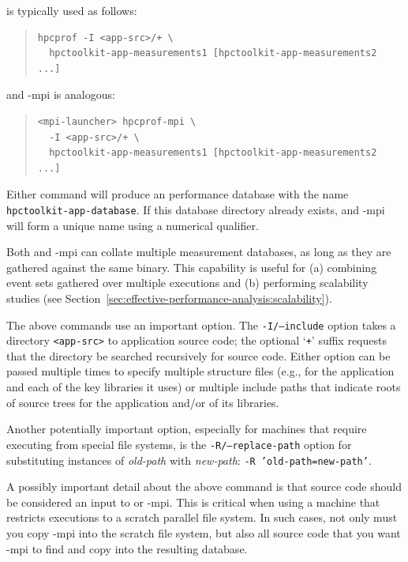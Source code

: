 \documentclass[11pt,twoside,letterpaper]{report}
\begin{document}
\hpcprof{} is typically used as follows:
\begin{quote}
\begin{verbatim}
hpcprof -I <app-src>/+ \
  hpctoolkit-app-measurements1 [hpctoolkit-app-measurements2 ...]
\end{verbatim}
\end{quote}
and \hpcprof-mpi{} is analogous:
\begin{quote}
\begin{verbatim}
<mpi-launcher> hpcprof-mpi \
  -I <app-src>/+ \
  hpctoolkit-app-measurements1 [hpctoolkit-app-measurements2 ...]
\end{verbatim}
\end{quote}
Either command will produce an \HPCToolkit{} performance database with the name \texttt{hpctoolkit-app-database}.
If this database directory already exists, \hpcprof{} and \hpcprof-mpi{} will form a unique name using a numerical qualifier.

Both \hpcprof{} and \hpcprof-mpi{} can collate multiple measurement databases, as long as they are gathered against the same binary.
This capability is useful for (a) combining event sets gathered over multiple executions
and (b) performing scalability studies (see Section~\ref{sec:effective-performance-analysis:scalability}).

The above commands use an important option.
The \texttt{-I/--include} option takes a directory \texttt{<app-src>} to application source code;
the optional `\texttt{+}' suffix requests that the directory be searched recursively for source code.
Either option can be passed multiple times to specify multiple structure files (e.g., for the application
and each of the key libraries it uses) or multiple include paths that indicate
roots of source trees for the application and/or of its libraries.

Another potentially important option, especially for machines that require executing from special file systems, is the \texttt{-R/--replace-path} option for substituting instances of \emph{old-path} with \emph{new-path}: \texttt{-R 'old-path=new-path'}.

A possibly important detail about the above command is that source code should be considered
an input to  \hpcprof{} or \hpcprof-mpi{}.
This is critical when using a machine that restricts executions to a scratch parallel file system.
In such cases,
not only must you copy \hpcprof-mpi{} into the scratch file system,
but also all source code that you want \hpcprof-mpi{} to find and copy into the resulting database.
\end{document}
